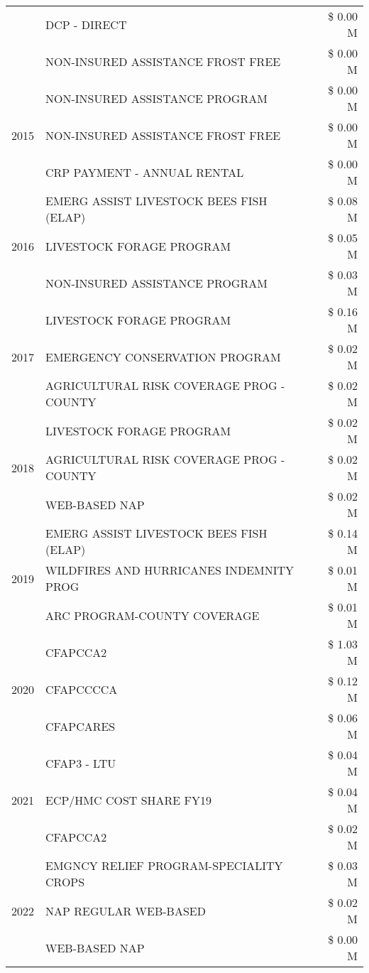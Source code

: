 \begin{tabular}{llr}
 & DCP - DIRECT & \$ 0.00 M \\
 & NON-INSURED ASSISTANCE FROST FREE & \$ 0.00 M \\
\cline{1-3}
\multirow[t]{3}{*}{2015} & NON-INSURED ASSISTANCE PROGRAM & \$ 0.00 M \\
 & NON-INSURED ASSISTANCE FROST FREE & \$ 0.00 M \\
 & CRP PAYMENT - ANNUAL RENTAL & \$ 0.00 M \\
\cline{1-3}
\multirow[t]{3}{*}{2016} & EMERG ASSIST LIVESTOCK BEES FISH (ELAP) & \$ 0.08 M \\
 & LIVESTOCK FORAGE PROGRAM & \$ 0.05 M \\
 & NON-INSURED ASSISTANCE PROGRAM & \$ 0.03 M \\
\cline{1-3}
\multirow[t]{3}{*}{2017} & LIVESTOCK FORAGE PROGRAM & \$ 0.16 M \\
 & EMERGENCY CONSERVATION PROGRAM & \$ 0.02 M \\
 & AGRICULTURAL RISK COVERAGE PROG - COUNTY & \$ 0.02 M \\
\cline{1-3}
\multirow[t]{3}{*}{2018} & LIVESTOCK FORAGE PROGRAM & \$ 0.02 M \\
 & AGRICULTURAL RISK COVERAGE PROG - COUNTY & \$ 0.02 M \\
 & WEB-BASED NAP & \$ 0.02 M \\
\cline{1-3}
\multirow[t]{3}{*}{2019} & EMERG ASSIST LIVESTOCK BEES FISH (ELAP) & \$ 0.14 M \\
 & WILDFIRES AND HURRICANES INDEMNITY PROG & \$ 0.01 M \\
 & ARC PROGRAM-COUNTY COVERAGE & \$ 0.01 M \\
\cline{1-3}
\multirow[t]{3}{*}{2020} & CFAPCCA2 & \$ 1.03 M \\
 & CFAPCCCCA & \$ 0.12 M \\
 & CFAPCARES & \$ 0.06 M \\
\cline{1-3}
\multirow[t]{3}{*}{2021} & CFAP3 - LTU & \$ 0.04 M \\
 & ECP/HMC COST SHARE FY19 & \$ 0.04 M \\
 & CFAPCCA2 & \$ 0.02 M \\
\cline{1-3}
\multirow[t]{3}{*}{2022} & EMGNCY RELIEF PROGRAM-SPECIALITY CROPS & \$ 0.03 M \\
 & NAP REGULAR WEB-BASED & \$ 0.02 M \\
 & WEB-BASED NAP & \$ 0.00 M \\
\cline{1-3}
\bottomrule
\end{tabular}
